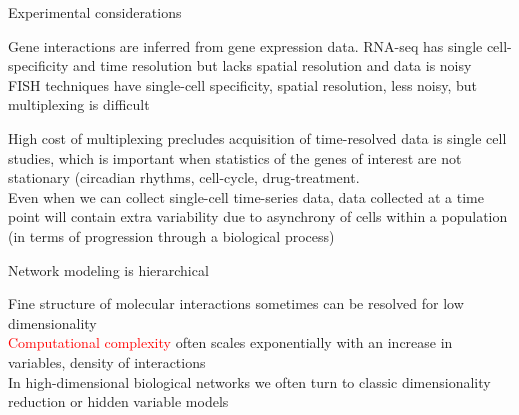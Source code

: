 \documentclass[aspectratio=1610]{beamer}					%
\begin{document}
\begin{frame}{Experimental considerations}

Gene interactions are inferred from gene expression data. RNA-seq has single cell-specificity and time resolution but lacks spatial resolution and data is noisy\\
\vspace{0.2in}
FISH techniques have single-cell specificity, spatial resolution, less noisy, but multiplexing is difficult\\
\vspace{0.2in}

High cost of multiplexing precludes acquisition of time-resolved data is single cell studies, which is important when statistics of the genes of interest are not stationary (circadian rhythms, cell-cycle, drug-treatment.\\
\vspace{0.2in}
Even when we can collect single-cell time-series data, data collected at a time point will contain extra variability due to asynchrony of cells within a population (in terms of progression through a biological process)\\

\end{frame}

\begin{frame}{Network modeling is hierarchical}

Fine structure of molecular interactions sometimes can be resolved for low dimensionality\\
\vspace{0.2in}
\textcolor{red}{Computational complexity} often scales exponentially with an increase in variables, density of interactions\\
\vspace{0.2in}
In high-dimensional biological networks we often turn to classic dimensionality reduction or hidden variable models\\


\end{frame}
\end{document}
